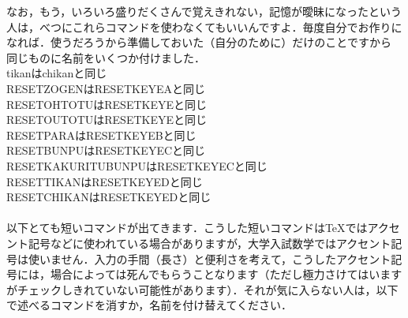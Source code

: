 \documentclass [10pt,fleqn,b5paper]{jsarticlek}
\begin{document}
{{なお，もう，いろいろ盛りだくさんで覚えきれない，記憶が曖昧になったという人は，べつにこれらコマンドを使わなくてもいいんですよ．毎度自分でお作りになれば．使うだろうから準備しておいた（自分のために）だけのことですから\\
同じものに名前をいくつか付けました．\\
tikanはchikanと同じ\\
RESETZOGENはRESETKEYEAと同じ\\
RESETOHTOTUはRESETKEYEと同じ\\
RESETOUTOTUはRESETKEYEと同じ\\
RESETPARAはRESETKEYEBと同じ\\
RESETBUNPUはRESETKEYECと同じ\\
RESETKAKURITUBUNPUはRESETKEYECと同じ\\
RESETTIKANはRESETKEYEDと同じ\\
RESETCHIKANはRESETKEYEDと同じ\\
\aki\\
\aki
{}
以下とても短いコマンドが出てきます．こうした短いコマンドはTeXではアクセント記号などに使われている場合がありますが，大学入試数学ではアクセント記号は使いません．入力の手間（長さ）と便利さを考えて，こうしたアクセント記号には，場合によっては死んでもらうことなります（ただし極力さけてはいますがチェックしきれていない可能性があります）．それが気に入らない人は，以下で述べるコマンドを消すか，名前を付け替えてください．

}}
\end{document}
